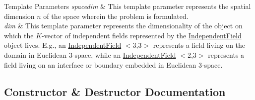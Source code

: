\begin{DoxyTemplParams}{Template Parameters}
{\em spacedim} & This template parameter represents the spatial dimension $n$ of the space wherein the problem is formulated.\\
\hline
{\em dim} & This template parameter represents the dimensionality of the object on which the $K$-\/vector of independent fields represented by the \hyperlink{class_independent_field}{Independent\+Field} object lives. E.\+g., an \hyperlink{class_independent_field}{Independent\+Field} $<$3,3$>$ represents a field living on the domain in Euclidean $3$-\/space, while an \hyperlink{class_independent_field}{Independent\+Field} $<$2,3$>$ represents a field living on an interface or boundary embedded in Euclidean $3$-\/space. \\
\hline
\end{DoxyTemplParams}


\subsection{Constructor \& Destructor Documentation}
